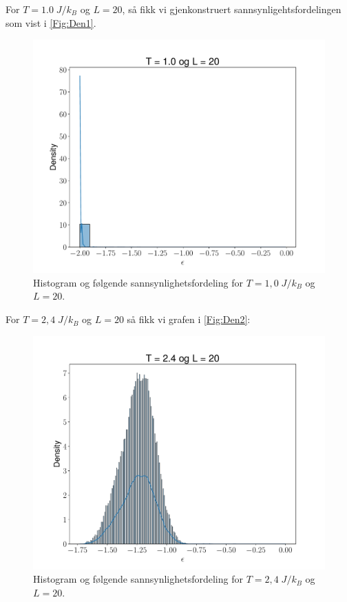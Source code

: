 \documentclass[reprint,english,notitlepage]{revtex4-2}  %
\begin{document}
For $T = 1.0 \; J/k_B$ og $L = 20$, så fikk vi gjenkonstruert sannsynligehtsfordelingen som vist i \autoref{Fig:Den1}.

\begin{figure}[H]
\centering
\includegraphics[scale=0.4, trim=2.5cm 0 0 0]{../Images/T100L20.pdf}
\caption{Histogram og følgende sannsynlighetsfordeling for $T = 1,0 \; J/k_B$ og $L = 20$.}
\label{Den1}
\end{figure}

For $ T = 2,4 \; J/k_B$ og $L = 20$ så fikk vi grafen i \autoref{Fig:Den2}:

\begin{figure}[H]
\centering
\includegraphics[scale=0.4, trim=2.5cm 0 0 0]{../Images/T240L20.pdf}
\caption{Histogram og følgende sannsynlighetsfordeling for $T = 2,4 \; J/k_B$ og $L = 20$.}
\label{Den2}
\end{figure}
\end{document}
